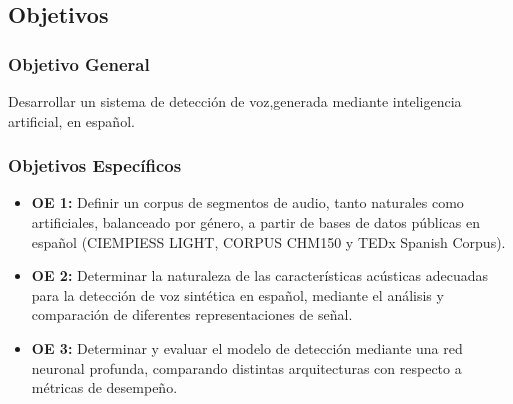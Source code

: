 \subsection{Objetivos}
\label{sec:objetivos}


\subsubsection{Objetivo General}
\label{subsec:objetivo_general}

Desarrollar un sistema de detección de voz,generada mediante inteligencia artificial, en español.


\subsubsection{Objetivos Específicos}
\label{subsec:objetivos_especificos}

\begin{itemize}
    \item \textbf{OE 1:}  Definir un corpus de segmentos de audio, tanto naturales como artificiales, balanceado por género, a partir de bases de datos públicas en español (CIEMPIESS LIGHT, CORPUS CHM150 y TEDx Spanish Corpus).
    \item \textbf{OE 2:} Determinar la naturaleza de las características acústicas adecuadas para la detección de voz sintética en español, mediante el análisis y comparación de diferentes representaciones de señal.
    \item \textbf{OE 3:} Determinar y evaluar el modelo de detección mediante una red neuronal profunda, comparando distintas arquitecturas con respecto a métricas de desempeño.
\end{itemize}

